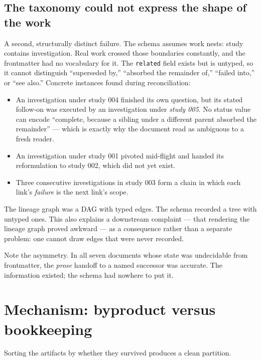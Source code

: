 \documentclass[11pt]{article}
\begin{document}
\subsection{The taxonomy could not express the shape of the work}

A second, structurally distinct failure. The schema assumes work nests:
study contains investigation. Real work crossed those boundaries
constantly, and the frontmatter had no vocabulary for it. The
\texttt{related} field exists but is untyped, so it cannot distinguish
``superseded by,'' ``absorbed the remainder of,'' ``failed into,'' or
``see also.'' Concrete instances found during reconciliation:

\begin{itemize}[topsep=3pt,itemsep=1pt]
  \item An investigation under study 004 finished its own question, but its
        stated follow-on was executed by an investigation under
        \emph{study 005}. No status value can encode ``complete, because a
        sibling under a different parent absorbed the remainder'' --- which
        is exactly why the document read as ambiguous to a fresh reader.
  \item An investigation under study 001 pivoted mid-flight and handed its
        reformulation to study 002, which did not yet exist.
  \item Three consecutive investigations in study 003 form a chain in which
        each link's \emph{failure} is the next link's scope.
\end{itemize}

\noindent
The lineage graph was a DAG with typed edges. The schema recorded a tree
with untyped ones. This also explains a downstream complaint --- that
rendering the lineage graph proved awkward --- as a consequence rather than
a separate problem: one cannot draw edges that were never recorded.

Note the asymmetry. In all seven documents whose state was undecidable from
frontmatter, the \emph{prose} handoff to a named successor was accurate.
The information existed; the schema had nowhere to put it.

\section{Mechanism: byproduct versus bookkeeping}
\label{sec:mechanism}

Sorting the artifacts by whether they survived produces a clean partition.
\end{document}
